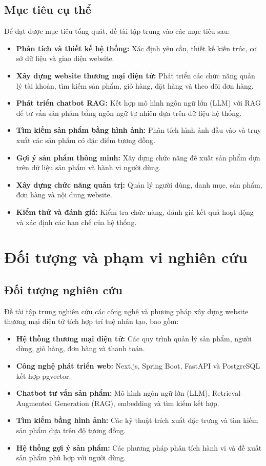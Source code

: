 \documentclass{report}
\begin{document}
\subsection{Mục tiêu cụ thể}
Để đạt được mục tiêu tổng quát, đề tài tập trung vào các mục tiêu sau:

\begin{itemize}
    \item \textbf{Phân tích và thiết kế hệ thống:} Xác định yêu cầu, thiết kế kiến trúc, cơ sở dữ liệu và giao diện website.
    \item \textbf{Xây dựng website thương mại điện tử:} Phát triển các chức năng quản lý tài khoản, tìm kiếm sản phẩm, giỏ hàng, 
    đặt hàng và theo dõi đơn hàng.
    \item \textbf{Phát triển chatbot RAG:} Kết hợp mô hình ngôn ngữ lớn (LLM) với RAG để tư vấn sản phẩm bằng ngôn ngữ tự nhiên 
    dựa trên dữ liệu hệ thống.
    \item \textbf{Tìm kiếm sản phẩm bằng hình ảnh:} Phân tích hình ảnh đầu vào và truy xuất các sản phẩm có đặc điểm tương đồng.
    \item \textbf{Gợi ý sản phẩm thông minh:} Xây dựng chức năng đề xuất sản phẩm dựa trên dữ liệu sản phẩm và hành vi người dùng.
    \item \textbf{Xây dựng chức năng quản trị:} Quản lý người dùng, danh mục, sản phẩm, đơn hàng và nội dung website.
    \item \textbf{Kiểm thử và đánh giá:} Kiểm tra chức năng, đánh giá kết quả hoạt động và xác định các hạn chế của hệ thống.
\end{itemize}

\section{Đối tượng và phạm vi nghiên cứu}
\subsection{Đối tượng nghiên cứu}
Đề tài tập trung nghiên cứu các công nghệ và phương pháp xây dựng website thương mại điện tử tích hợp trí tuệ nhân tạo, bao 
gồm:

\begin{itemize}
    \item \textbf{Hệ thống thương mại điện tử:} Các quy trình quản lý sản phẩm, người dùng, giỏ hàng, đơn hàng và thanh toán.
    \item \textbf{Công nghệ phát triển web:} Next.js, Spring Boot, FastAPI và PostgreSQL kết hợp pgvector.
    \item \textbf{Chatbot tư vấn sản phẩm:} Mô hình ngôn ngữ lớn (LLM), Retrieval-Augmented Generation (RAG), embedding và 
    tìm kiếm kết hợp.
    \item \textbf{Tìm kiếm bằng hình ảnh:} Các kỹ thuật trích xuất đặc trưng và tìm kiếm sản phẩm dựa trên độ tương đồng.
    \item \textbf{Hệ thống gợi ý sản phẩm:} Các phương pháp phân tích hành vi và đề xuất sản phẩm phù hợp với người dùng.
\end{itemize}
\end{document}
